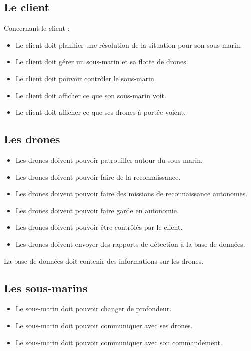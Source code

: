 
\subsection{Le client}
Concernant le client : 
\begin{itemize}
	\item Le client doit planifier une résolution de la situation pour son sous-marin.
	\item Le client doit gérer un sous-marin et sa flotte de drones.
	\item Le client doit pouvoir contrôler le sous-marin.
	\item Le client doit afficher ce que son sous-marin voit.
	\item Le client doit afficher ce que ses drones à portée voient.
\end{itemize}


\subsection{Les drones}
\begin{itemize}
	\item Les drones doivent pouvoir patrouiller autour du sous-marin.
	\item Les drones doivent pouvoir faire de la reconnaissance.
	\item Les drones doivent pouvoir faire des missions de reconnaissance autonomes.
	\item Les drones doivent pouvoir faire garde en autonomie.
	\item Les drones doivent pouvoir être contrôlés par le client.
	\item Les drones doivent envoyer des rapports de détection à la base de données.
\end{itemize}

La base de données doit contenir des informations sur les drones.

\subsection{Les sous-marins}
\begin{itemize}
	\item Le sous-marin doit pouvoir changer de profondeur.
	\item Le sous-marin doit pouvoir communiquer avec ses drones.
	\item Le sous-marin doit pouvoir communiquer avec son commandement.
\end{itemize}
